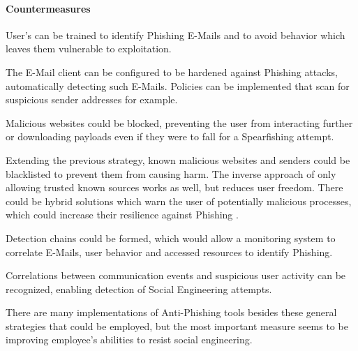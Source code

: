 \documentclass[../report.tex]{subfiles}
\begin{document}
\paragraph{Countermeasures}
\begin{itemize}
User's can be trained to identify Phishing E-Mails and to avoid behavior which leaves them vulnerable to exploitation.

The E-Mail client can be configured to be hardened against Phishing attacks, automatically detecting such E-Mails. Policies can be implemented that scan for suspicious sender addresses for example.

Malicious websites could be blocked, preventing the user from interacting further or downloading payloads even if they were to fall for a Spearfishing attempt.

Extending the previous strategy, known malicious websites and senders could be blacklisted to prevent them from causing harm. 
The inverse approach of only allowing trusted known sources works as well, but reduces user freedom. There could be hybrid solutions which warn the user of potentially malicious processes, which could increase their resilience against Phishing \autocite{Jain2016AutoUpdatedWhitelist}.

Detection chains could be formed, which would allow a monitoring system to correlate E-Mails, user behavior and accessed resources to identify Phishing.

Correlations between communication events and suspicious user activity can be recognized, enabling detection of Social Engineering attempts.
\end{itemize}

There are many implementations of Anti-Phishing tools besides these general strategies that could be employed, but the most important measure seems to be improving employee's abilities to resist social engineering.
\end{document}
